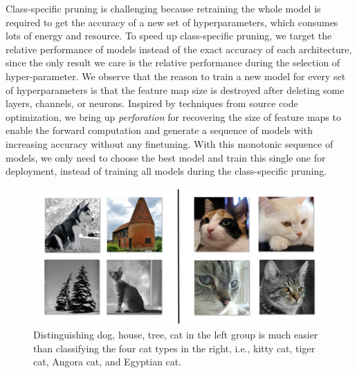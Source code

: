 \documentclass[pageno]{jpaper}
\begin{document}
Class-specific pruning is challenging because retraining the whole model is required to get the accuracy of a new set of hyperparameters, which consumes lots of energy and resource. To speed up class-specific pruning, we target the relative performance of models instead of the exact accuracy of each architecture, since the only result we care is the relative performance during the selection of hyper-parameter. We observe that the reason to train a new model for every set of hyperparameters is that the feature map size is destroyed after deleting some layers, channels, or neurons. Inspired by techniques from source code optimization, we bring up \textit{perforation} for recovering the size of feature maps to enable the forward computation and generate a sequence of models with increasing accuracy without any finetuning. With this monotonic sequence of models, we only need to choose the best model and train this single one for deployment, instead of training all models during the class-specific pruning.

\begin{figure}
    \centering
    \includegraphics [scale=0.12] {twoGroups.png}
    \caption{Distinguishing dog, house, tree, cat in the left group is much easier than classifying the four cat types in the right, i.e., kitty cat, tiger cat, Angora cat, and Egyptian cat. }
    \label{fig:classEffect}
\end{figure}
\end{document}
